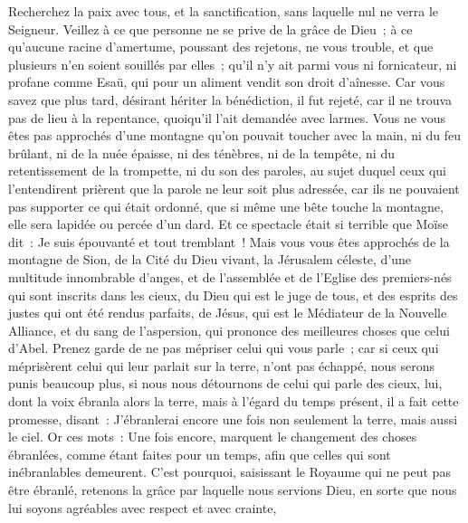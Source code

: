 \begin{multicols}{2}
Recherchez la paix avec tous, et la sanctification, sans laquelle nul ne verra le Seigneur.
Veillez à ce que personne ne se prive de la grâce de Dieu~; à ce qu'aucune racine d'amertume, poussant des rejetons, ne vous trouble, et que plusieurs n'en soient souillés par elles~;
qu'il n'y ait parmi vous ni fornicateur, ni profane comme Esaü, qui pour un aliment vendit son droit d'aînesse.
Car vous savez que plus tard, désirant hériter la bénédiction, il fut rejeté, car il ne trouva pas de lieu à la repentance, quoiqu'il l'ait demandée avec larmes.
Vous ne vous êtes pas approchés d'une montagne qu'on pouvait toucher avec la main, ni du feu brûlant, ni de la nuée épaisse, ni des ténèbres, ni de la tempête,
ni du retentissement de la trompette, ni du son des paroles, au sujet duquel ceux qui l'entendirent prièrent que la parole ne leur soit plus adressée,
car ils ne pouvaient pas supporter ce qui était ordonné, que si même une bête touche la montagne, elle sera lapidée ou percée d'un dard.
Et ce spectacle était si terrible que Moïse dit~: Je suis épouvanté et tout tremblant~!
Mais vous vous êtes approchés de la montagne de Sion, de la Cité du Dieu vivant, la Jérusalem céleste, d'une multitude innombrable d'anges,
et de l'assemblée et de l'Eglise des premiers-nés qui sont inscrits dans les cieux, du Dieu qui est le juge de tous, et des esprits des justes qui ont été rendus parfaits,
de Jésus, qui est le Médiateur de la Nouvelle Alliance, et du sang de l'aspersion, qui prononce des meilleures choses que celui d'Abel.
Prenez garde de ne pas mépriser celui qui vous parle~; car si ceux qui méprisèrent celui qui leur parlait sur la terre, n'ont pas échappé, nous serons punis beaucoup plus, si nous nous détournons de celui qui parle des cieux,
lui, dont la voix ébranla alors la terre, mais à l'égard du temps présent, il a fait cette promesse, disant~: J'ébranlerai encore une fois non seulement la terre, mais aussi le ciel.
Or ces mots~: Une fois encore, marquent le changement des choses ébranlées, comme étant faites pour un temps, afin que celles qui sont inébranlables demeurent.
C'est pourquoi, saisissant le Royaume qui ne peut pas être ébranlé, retenons la grâce par laquelle nous servions Dieu, en sorte que nous lui soyons agréables avec respect et avec crainte,

\end{multicols}
